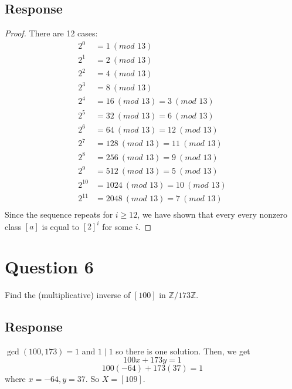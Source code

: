 \documentclass[13pt]{article}
\begin{document}
\subsection*{Response}
\begin{proof}
  There are 12 cases:
  \begin{align*}
    2^0 &= 1 \ (\textit{mod } 13) \\
    2^1 &= 2 \ (\textit{mod } 13) \\
    2^2 &= 4 \ (\textit{mod } 13) \\
    2^3 &= 8 \ (\textit{mod } 13) \\
    2^4 &= 16 \ (\textit{mod } 13) = 3 \ (\textit{mod } 13) \\
    2^5 &= 32 \ (\textit{mod } 13) = 6 \ (\textit{mod } 13) \\
    2^6 &= 64 \ (\textit{mod } 13) = 12 \ (\textit{mod } 13) \\
    2^7 &= 128 \ (\textit{mod } 13) = 11 \ (\textit{mod } 13) \\
    2^8 &= 256 \ (\textit{mod } 13) = 9 \ (\textit{mod } 13) \\
    2^9 &= 512 \ (\textit{mod } 13) = 5 \ (\textit{mod } 13) \\
    2^{10} &= 1024 \ (\textit{mod } 13) = 10 \ (\textit{mod } 13) \\
    2^{11} &= 2048 \ (\textit{mod } 13) = 7 \ (\textit{mod } 13) \\
  \end{align*}
  Since the sequence repeats for $i \geq 12$, we have shown that every every nonzero class $[a]$ is
  equal to $[2]^i$ for some $i$.
\end{proof}





\newpage
\section*{Question 6}
Find the (multiplicative) inverse of $[100]$ in $\mathbb{Z}/173\mathbb{Z}$.

\subsection*{Response}
$\gcd(100, 173) = 1$ and $1 \mid 1$ so there is one solution. Then, we get
\[100x + 173y = 1\]
\[100(-64) + 173(37) = 1\]
where $x = -64, y = 37$. So $X = [109]$.
\end{document}
